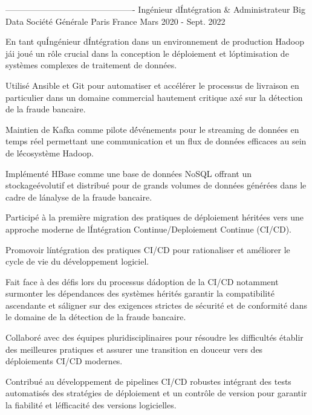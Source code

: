 \begin{cventries}
----------------------------------------------
  \cventry
    {Ingénieur d\' Intégration \& Administrateur Big Data} %
    {Société Générale} %
    {Paris France} %
    {Mars 2020 - Sept. 2022} %
    {
      \begin{cvitems} %
        \item {En tant qu\' Ingénieur d\' Intégration dans un environnement de production Hadoop  j\' ai joué un rôle crucial dans la conception le déploiement et l\' optimisation de systèmes complexes de traitement de données.}
        \item {Utilisé Ansible et Git pour automatiser et accélérer le processus de livraison en particulier dans un domaine commercial hautement critique axé sur la détection de la fraude bancaire.}
        \item {Maintien de Kafka comme pilote d\' événements pour le streaming de données en temps réel permettant une communication et un flux de données efficaces au sein de l\' écosystème Hadoop.}
        \item {Implémenté HBase comme une base de données NoSQL offrant un stockageévolutif et distribué pour de grands volumes de données générées dans le cadre de l\' analyse de la fraude bancaire.}
        \item {Participé à la première migration des pratiques de déploiement héritées vers une approche moderne de l\' Intégration Continue/Deploiement Continue (CI/CD).}
        \item {Promovoir l\' intégration des pratiques CI/CD pour rationaliser et améliorer le cycle de vie du développement logiciel.}
        \item {Fait face à des défis lors du processus d\' adoption de la CI/CD notamment surmonter les dépendances des systèmes hérités garantir la compatibilité ascendante et s\' aligner sur des exigences strictes de sécurité et de conformité dans le domaine de la détection de la fraude bancaire.}
        \item {Collaboré avec des équipes pluridisciplinaires pour résoudre les difficultés établir des meilleures pratiques et assurer une transition en douceur vers des déploiements CI/CD modernes.}
        \item {Contribué au développement de pipelines CI/CD robustes intégrant des tests automatisés des stratégies de déploiement et un contrôle de version pour garantir la fiabilité et l\' efficacité des versions logicielles.}
      \end{cvitems}
      
}
\end{cventries}

